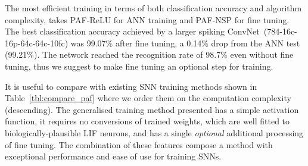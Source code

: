 	
	
	
	The most efficient training in terms of both classification accuracy and algorithm complexity, takes PAF-ReLU for ANN training and PAF-NSP for fine tuning.
	The best classification accuracy achieved by a larger spiking ConvNet~(784-16c-16p-64c-64c-10fc) was 99.07\% after fine tuning, a 0.14\% drop from the ANN test (99.21\%).
	The network reached the recognition rate of 98.7\% even without fine tuning, thus we suggest to make fine tuning an optional step for training.

	
	It is useful to compare with existing SNN training methods shown in Table~\ref{tbl:compare_paf} where we order them on the computation complexity (descending).
	The generalised training method presented \DIFdelbegin {}\DIFdelend \DIFaddbegin {}\DIFaddend has a simple activation function, it requires no conversions of trained weights, which are well fitted to biologically-plausible LIF neurons, and has a single \emph{optional} additional processing of fine tuning.
	The combination of these features compose a method with exceptional performance and ease of use for training SNNs.

